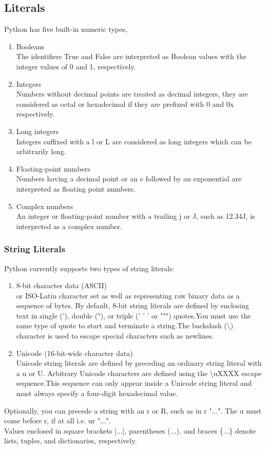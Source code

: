 \documentclass[12pt]{article}
\begin{document}
\subsection{Literals}
Python has five built-in numeric types,
\begin{enumerate}
\item Booleans\\
The identifiers True and False are interpreted as Boolean values with the integer values of 0 and 1, respectively.
\item Integers\\
Numbers without decimal points are treated as decimal integers, they are considered as octal or hexadecimal if they are prefixed with 0 and 0x respectively.
\item Long integers\\
Integers suffixed with a l or L are considered as long integers which can be arbitrarily long.
\item Floating-point numbers\\
Numbers having a decimal point or an e followed by an exponential are interpreted as floating point numbers.
\item Complex numbers\\
An integer or floating-point number with a trailing j or J, such as 12.34J, is interpreted as a complex number.
\end{enumerate}
\subsubsection{String Literals}
Python currently supports two types of string literals:
\begin{enumerate}
\item 8-bit character data (ASCII)\\
or ISO-Latin character set as well as representing raw
binary data as a sequence of bytes. By default, 8-bit string literals are defined by enclosing text in single ('), double ("), or triple (' ' ' or """) quotes.You must use the same type of quote to start and terminate a string.The backslash (\textbackslash) character is used to escape special characters such as newlines.
\item Unicode (16-bit-wide character data)\\
Unicode string literals are defined by preceding an ordinary string literal with a u or U. Arbitrary Unicode characters are defined using the \textbackslash uXXXX escape sequence.This sequence can only appear inside a Unicode string literal and must always specify a four-digit hexadecimal value.
\end{enumerate}
Optionally, you can precede a string with an r or R, such as in r "...". The u must come before r, if at all i.e. ur "...".\\
Values enclosed in square brackets [...], parentheses (...), and braces \{...\}
denote lists, tuples, and dictionaries, respectively.
\end{document}
